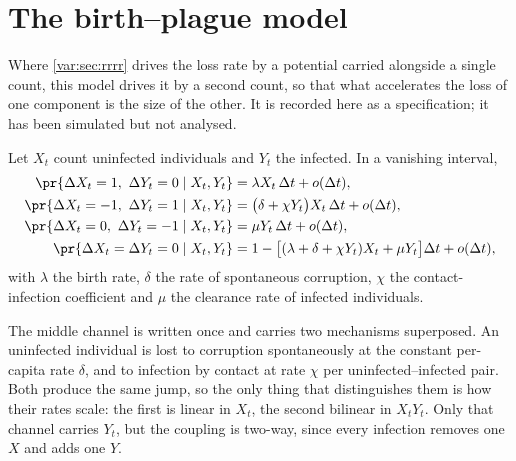 \renewcommand{\thesection}{\thechapter.\Alph{section}}
\setcounter{section}{0}


\section{The birth--plague model}
\label{var:app:plague}

Where \cref{var:sec:rrrr} drives the loss rate by a potential carried
alongside a single count, this model drives it by a second count, so that
what accelerates the loss of one component is the size of the other. It is
recorded here as a specification; it has been simulated but not analysed.

Let $X_t$ count uninfected individuals and $Y_t$ the infected. In a vanishing
interval,
\begin{align}
\pr{\Delta X_t=1,\ \Delta Y_t=0\mid X_t,Y_t}
  &=\lambda X_t\,\Delta t+o(\Delta t),
  \label{var:eq:plague}\\
\pr{\Delta X_t=-1,\ \Delta Y_t=1\mid X_t,Y_t}
  &=\bigl(\delta+\chi Y_t\bigr)X_t\,\Delta t+o(\Delta t),\notag\\
\pr{\Delta X_t=0,\ \Delta Y_t=-1\mid X_t,Y_t}
  &=\mu Y_t\,\Delta t+o(\Delta t),\notag\\
\pr{\Delta X_t=\Delta Y_t=0\mid X_t,Y_t}
  &=1-\bigl[(\lambda+\delta+\chi Y_t)X_t+\mu Y_t\bigr]\Delta t+o(\Delta t),
  \notag
\end{align}
with $\lambda$ the birth rate, $\delta$ the rate of spontaneous corruption,
$\chi$ the contact-infection coefficient and $\mu$ the clearance rate of
infected individuals.

The middle channel is written once and carries two mechanisms superposed. An
uninfected individual is lost to corruption spontaneously at the constant
per-capita rate $\delta$, and to infection by contact at rate $\chi$ per
uninfected--infected pair. Both produce the same jump, so the only thing that
distinguishes them is how their rates scale: the first is linear in $X_t$,
the second bilinear in $X_tY_t$. Only that channel carries $Y_t$, but the
coupling is two-way, since every infection removes one $X$ and adds one $Y$.

